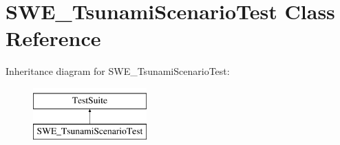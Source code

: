 \hypertarget{classSWE__TsunamiScenarioTest}{\section{S\-W\-E\-\_\-\-Tsunami\-Scenario\-Test Class Reference}
\label{classSWE__TsunamiScenarioTest}
}
Inheritance diagram for S\-W\-E\-\_\-\-Tsunami\-Scenario\-Test\-:\begin{figure}[H]
\begin{center}
\leavevmode
\includegraphics[height=2.000000cm]{classSWE__TsunamiScenarioTest}
\end{center}
\end{figure}
